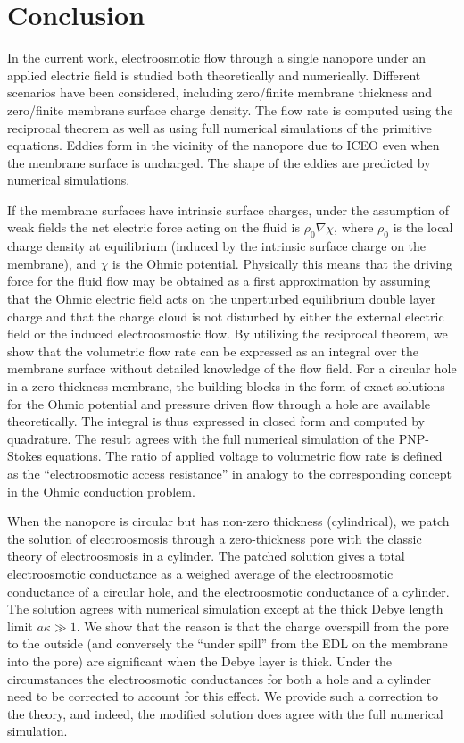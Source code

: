 \chapter{Conclusion}
In the current work, electroosmotic flow through a single nanopore under an applied electric field is studied both theoretically and numerically. Different scenarios have been considered, including zero/finite membrane thickness and zero/finite 
membrane surface charge density. The flow rate is computed using the reciprocal theorem as well as using full numerical simulations of the primitive equations. Eddies form in the vicinity of the nanopore due to ICEO even when the membrane surface is uncharged. The shape of the eddies are predicted by numerical simulations.

If the membrane surfaces have intrinsic surface charges, under the assumption of weak fields the net electric force acting on the fluid is $\rho_0\nabla\chi$, where $\rho_0$ is the local charge density at equilibrium (induced by the intrinsic surface charge on the membrane), and $\chi$ is the Ohmic potential. Physically this means that the driving force for the fluid flow may be obtained as a first approximation by assuming that the Ohmic electric field acts on the unperturbed equilibrium double layer charge and that the charge cloud is not disturbed by either the external electric field or the induced electroosmostic flow. By utilizing the reciprocal theorem, we show that the volumetric flow rate can be expressed as an integral over the membrane surface  without detailed knowledge of the flow field. For a circular hole in a zero-thickness membrane, the building blocks in the form of exact solutions for the Ohmic potential and pressure driven flow through a hole
are available theoretically. The integral is thus expressed in closed form and computed by quadrature. The result agrees with the full numerical simulation of the PNP-Stokes equations. The ratio of applied voltage to volumetric flow rate is defined as the  ``electroosmotic access resistance'' in analogy to the corresponding concept in the Ohmic conduction problem.

When the nanopore is circular but has non-zero thickness (cylindrical), we patch the solution of electroosmosis through a zero-thickness pore with the classic theory of electroosmosis in a cylinder. The patched solution gives a total electroosmotic conductance as a weighed average of the electroosmotic conductance of a circular hole, and the electroosmotic conductance of a cylinder. The solution agrees with numerical simulation except at the thick Debye length limit $a\kappa \gg 1$. We show that the reason is that the charge overspill from the pore to the outside (and conversely the ``under spill'' from the EDL on the membrane into the pore) are significant when the Debye layer is thick. Under the circumstances the electroosmotic conductances for both a hole and a cylinder need to be corrected to account for this effect. We  provide such a correction to  the theory, and indeed, the modified solution does agree with the full numerical simulation.

